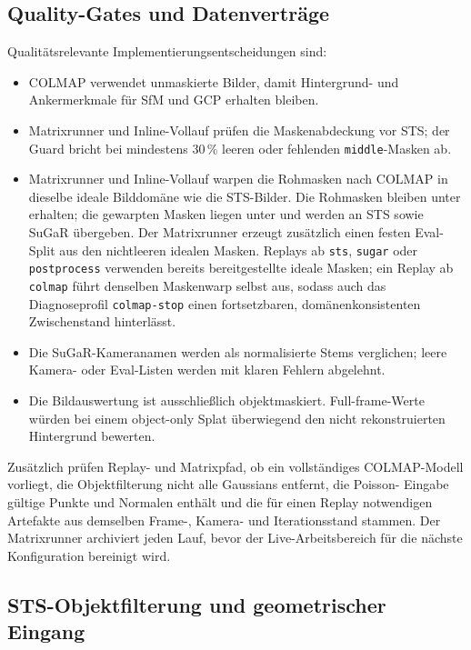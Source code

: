 \subsection{Quality-Gates und Datenverträge}

Qualitätsrelevante Implementierungsentscheidungen sind:

\begin{itemize}
  \item COLMAP verwendet unmaskierte Bilder, damit Hintergrund- und
        Ankermerkmale für SfM und GCP erhalten bleiben.
  \item Matrixrunner und Inline-Vollauf prüfen die Maskenabdeckung vor STS;
        der Guard bricht bei mindestens 30\,\% leeren oder fehlenden
        \texttt{middle}-Masken ab.
  \item Matrixrunner und Inline-Vollauf warpen die Rohmasken nach COLMAP in
        dieselbe ideale Bilddomäne wie die STS-Bilder. Die Rohmasken bleiben
        unter  erhalten; die gewarpten Masken liegen unter
         und werden an STS sowie SuGaR übergeben.
        Der Matrixrunner erzeugt zusätzlich einen festen Eval-Split aus den
        nichtleeren idealen Masken. Replays ab \texttt{sts},
        \texttt{sugar} oder \texttt{postprocess} verwenden bereits
        bereitgestellte ideale Masken; ein Replay ab \texttt{colmap} führt
        denselben Maskenwarp selbst aus, sodass auch das Diagnoseprofil
        \texttt{colmap-stop} einen fortsetzbaren, domänenkonsistenten
        Zwischenstand hinterlässt.
  \item Die SuGaR-Kameranamen werden als normalisierte Stems verglichen; leere
        Kamera- oder Eval-Listen werden mit klaren Fehlern abgelehnt.
  \item Die Bildauswertung ist ausschließlich objektmaskiert. Full-frame-Werte
        würden bei einem object-only Splat überwiegend den nicht rekonstruierten
        Hintergrund bewerten.
\end{itemize}

Zusätzlich prüfen Replay- und Matrixpfad, ob ein vollständiges COLMAP-Modell
vorliegt, die Objektfilterung nicht alle Gaussians entfernt, die Poisson-
Eingabe gültige Punkte und Normalen enthält und die für einen Replay
notwendigen Artefakte aus demselben Frame-, Kamera- und Iterationsstand stammen.
Der Matrixrunner archiviert jeden Lauf, bevor der Live-Arbeitsbereich für die
nächste Konfiguration bereinigt wird.

\subsection{STS-Objektfilterung und geometrischer Eingang}

